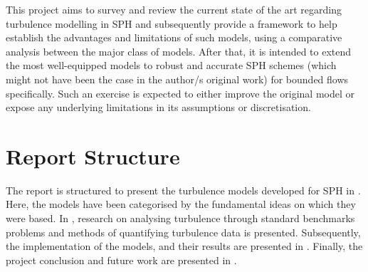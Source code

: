This project aims to survey and review the current state of the art regarding turbulence modelling in SPH and subsequently provide a framework to help establish the advantages and limitations of such models, using a comparative analysis between the major class of models.
After that, it is intended to extend the most well-equipped models to robust and accurate SPH schemes (which might not have been the case in the author/s original work) for bounded flows specifically. Such an exercise is expected to either improve the original model or expose any underlying limitations in its assumptions or discretisation.

\section{Report Structure}
The report is structured to present the turbulence models developed for SPH in . Here, the models have been categorised by the fundamental ideas on which they were based. In , research on analysing turbulence through standard benchmarks problems and methods of quantifying turbulence data is presented.
Subsequently, the implementation of the models, and their results are presented in .
Finally, the project conclusion and future work are presented in .
